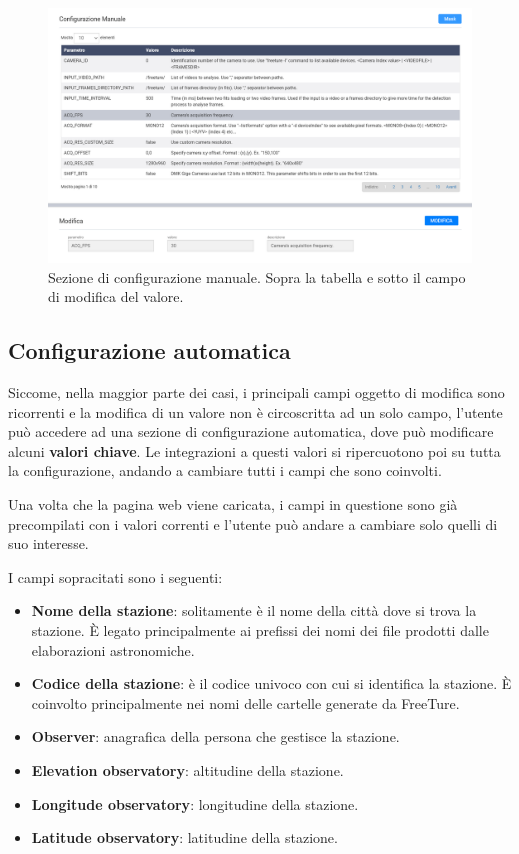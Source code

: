 \begin{figure}[H]
    \begin{center}
    \includegraphics[width=\textwidth]{images/conf-manuale.png}
    \caption{Sezione di configurazione manuale. Sopra la tabella e sotto il campo di modifica del valore.}
    \end{center}
\end{figure}

\subsection{Configurazione automatica} \label{ft-conf-automatica}

Siccome, nella maggior parte dei casi, i principali campi oggetto di modifica sono ricorrenti e la modifica di un valore non è circoscritta ad un solo campo, l'utente può accedere ad una sezione di configurazione automatica, dove può modificare alcuni \textbf{valori chiave}. Le integrazioni a questi valori si ripercuotono poi su tutta la configurazione, andando a cambiare tutti i campi che sono coinvolti.

Una volta che la pagina web viene caricata, i campi in questione sono già precompilati con i valori correnti e l'utente può andare a cambiare solo quelli di suo interesse.

I campi sopracitati sono i seguenti:
\begin{itemize}
    \item \textbf{Nome della stazione}: solitamente è il nome della città dove si trova la stazione. È legato principalmente ai prefissi dei nomi dei file prodotti dalle elaborazioni astronomiche.
    \item \textbf{Codice della stazione}: è il codice univoco con cui si identifica la stazione. È coinvolto principalmente nei nomi delle cartelle generate da FreeTure.
    \item \textbf{Observer}: anagrafica della persona che gestisce la stazione.
    \item \textbf{Elevation observatory}: altitudine della stazione.
    \item \textbf{Longitude observatory}: longitudine della stazione.
    \item \textbf{Latitude observatory}: latitudine della stazione.
\end{itemize}

